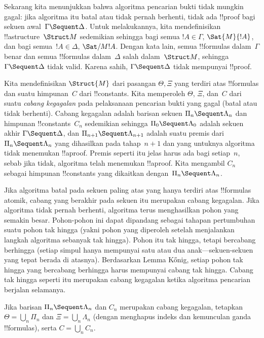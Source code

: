\documentclass[../../../include/open-logic-section]{subfiles}
\begin{document}


Sekarang kita menunjukkan bahwa algoritma pencarian bukti tidak mungkin
gagal: jika algoritma itu batal atau tidak pernah berhenti, tidak ada
!!{proof} bagi sekuen awal~$\Gamma \Sequent \Delta$. Untuk melakukannya,
kita mendefinisikan !!a{structure}~$\Struct M$ sedemikian sehingga bagi
semua $!A \in \Gamma$, $\Sat{M}{!A}$, dan bagi semua~$!A \in \Delta$,
$\Sat/{M}{!A}$. Dengan kata lain, semua !!{formula}s dalam~$\Gamma$ benar
dan semua !!{formula}s dalam~$\Delta$ salah dalam~$\Struct M$, sehingga
$\Gamma \Sequent \Delta$ tidak valid. Karena  sahih,
$\Gamma \Sequent \Delta$ tidak mempunyai !!{proof}.

Kita mendefinisikan $\Struct{M}$ dari pasangan $\Theta, \Xi$ yang terdiri
atas !!{formula}s dan suatu himpunan~$C$ dari !!{constant}s. Kita memperoleh
$\Theta$, $\Xi$, dan~$C$ dari suatu \emph{cabang kegagalan} pada pelaksanaan
pencarian bukti yang gagal (batal atau tidak berhenti). Cabang kegagalan
adalah barisan sekuen $\Pi_n \Sequent \Lambda_n$ dan himpunan
!!{constant}s~$C_n$ sedemikian sehingga $\Pi_0 \Sequent \Lambda_0$ adalah
sekuen akhir $\Gamma \Sequent \Delta$, dan
$\Pi_{n+1} \Sequent \Lambda_{n+1}$ adalah suatu premis dari
$\Pi_n \Sequent \Lambda_n$ yang dihasilkan pada tahap~$n+1$ dan yang
untuknya algoritma tidak menemukan !!a{proof}. Premis seperti itu jelas harus
ada bagi setiap~$n$, sebab jika tidak, algoritma telah menemukan
!!a{proof}. Kita mengambil $C_n$ sebagai himpunan !!{constant}s yang
dikaitkan dengan~$\Pi_n \Sequent \Lambda_n$.

Jika algoritma batal pada sekuen paling atas yang hanya terdiri atas
!!{formula}s atomik, cabang yang berakhir pada sekuen itu merupakan cabang
kegagalan. Jika algoritma tidak pernah berhenti, algoritma terus menghasilkan
pohon yang semakin besar. Pohon-pohon ini dapat dipandang sebagai tahapan
pertumbuhan suatu pohon tak hingga (yakni pohon yang diperoleh setelah
menjalankan langkah algoritma sebanyak tak hingga). Pohon itu tak hingga,
tetapi bercabang berhingga (setiap simpul hanya mempunyai satu atau dua
anak---sekuen-sekuen yang tepat berada di atasnya). Berdasarkan Lemma
K\H{o}nig, setiap pohon tak hingga yang bercabang berhingga harus mempunyai
cabang tak hingga. Cabang tak hingga seperti itu merupakan cabang kegagalan
ketika algoritma pencarian berjalan selamanya.

Jika barisan $\Pi_n \Sequent \Lambda_n$ dan $C_n$ merupakan cabang
kegagalan, tetapkan $\Theta = \bigcup_n \Pi_n$ dan
$\Xi = \bigcup_n \Lambda_n$ (dengan menghapus indeks dan kemunculan ganda
!!{formula}s), serta $C = \bigcup_n C_n$.
\end{document}
